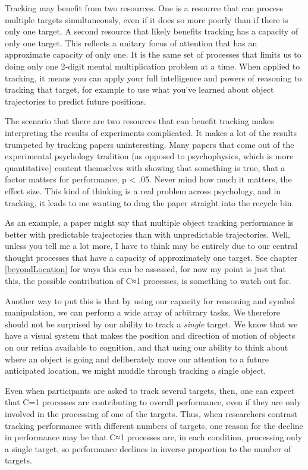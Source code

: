 \documentclass[
]{book}
\begin{document}
Tracking may benefit from two resources. One is a resource that can process multiple targets simultaneously, even if it does so more poorly than if there is only one target. A second resource that likely benefits tracking has a capacity of only one target. This reflects a unitary focus of attention that has an approximate capacity of only one. It is the same set of processes that limits us to doing only one 2-digit mental multiplication problem at a time. When applied to tracking, it means you can apply your full intelligence and powers of reasoning to tracking that target, for example to use what you've learned about object trajectories to predict future positions.

The scenario that there are two resources that can benefit tracking makes interpreting the results of experiments complicated. It makes a lot of the results trumpeted by tracking papers uninteresting. Many papers that come out of the experimental psychology tradition (as opposed to psychophysics, which is more quantitative) content themselves with showing that something is true, that a factor matters for performance, p \textless{} .05. Never mind how much it matters, the effect size. This kind of thinking is a real problem across psychology, and in tracking, it leads to me wanting to drag the paper straight into the recycle bin.

As an example, a paper might say that multiple object tracking performance is better with predictable trajectories than with unpredictable trajectories. Well, unless you tell me a lot more, I have to think may be entirely due to our central thought processes that have a capacity of approximately one target. See chapter \ref{beyondLocation} for ways this can be assessed, for now my point is just that this, the possible contribution of C≈1 processes, is something to watch out for.

Another way to put this is that by using our capacity for reasoning and symbol manipulation, we can perform a wide array of arbitrary tasks. We therefore should not be surprised by our ability to track a \emph{single} target. We know that we have a visual system that makes the position and direction of motion of objects on our retina available to cognition, and that using our ability to think about where an object is going and deliberately move our attention to a future anticipated location, we might muddle through tracking a single object.

Even when participants are asked to track several targets, then, one can expect that C=1 processes are contributing to overall performance, even if they are only involved in the processing of one of the targets. Thus, when researchers contrast tracking performance with different numbers of targets, one reason for the decline in performance may be that C≈1 processes are, in each condition, processing only a single target, so performance declines in inverse proportion to the number of targets.
\end{document}
